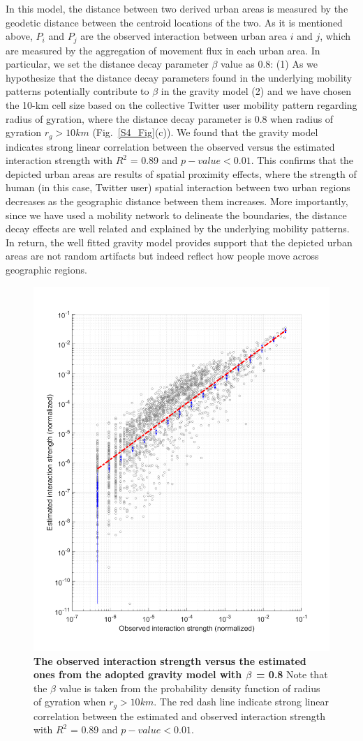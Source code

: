 \documentclass[]{tGIS2e}
\begin{document}
In this model, the distance between two derived urban areas is measured by the geodetic distance between the centroid locations of the two.
As it is mentioned above,  $P_{i}$ and $P_{j}$  are the observed interaction between urban area $i$ and $j$, which are measured by the aggregation of movement flux in each urban area.
In particular, we set the distance decay parameter $\beta$ value as 0.8: (1) As we hypothesize that the distance decay parameters found in the underlying mobility patterns potentially contribute to $\beta$ in the gravity model (2) and we have chosen the 10-km cell size based on the collective Twitter user mobility pattern regarding radius of gyration, where the distance decay parameter is 0.8 when radius of gyration $r_{g} > 10 km$ (Fig.~\ref{S4_Fig}(c)).
We found that the gravity model indicates strong linear correlation between the observed versus the estimated interaction strength with $R^{2}$ = 0.89 and $p-value < 0.01$.
This confirms that the depicted urban areas are results of spatial proximity effects, where the strength of human (in this case, Twitter user) spatial interaction between two urban regions decreases as the geographic distance between them increases.
More importantly, since we have used a mobility network to delineate the boundaries, the distance decay effects are well related and explained by the underlying mobility patterns.
In return, the well fitted gravity model provides support that the depicted urban areas are not random artifacts but indeed reflect how people move across geographic regions. 

\begin{figure}[ht]
\begin{center}
\includegraphics[width=0.7\linewidth]{./figure/Gravity}
\caption{{\bf The observed interaction strength versus the estimated ones from the adopted gravity model with $\bf{\beta}$ = 0.8 } Note that the $\beta$ value is taken from the probability density function of radius of gyration when $r_{g} > 10 km$. The red dash line indicate strong linear correlation between the estimated and observed interaction strength with $R^{2}$ = 0.89 and $p-value < 0.01$.}
\label{S8_Fig}
\end{center}
\end{figure}
\end{document}
